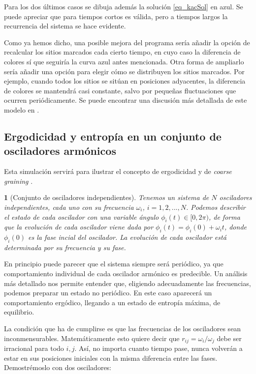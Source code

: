 \documentclass[11pt, a4paper]{article} %
\theoremstyle{named}
\newtheorem*{namedtheorem}{}
\begin{document}
Para los dos últimos casos se dibuja además la solución \eqref{eq_kacSol} en azul. Se puede apreciar que para tiempos cortos es válida, pero a tiempos largos la recurrencia del sistema se hace evidente.

Como ya hemos dicho, una posible mejora del programa sería añadir la opción de recalcular los sitios marcados cada cierto tiempo, en cuyo caso la diferencia de colores sí que seguiría la curva azul antes mencionada. Otra forma de ampliarlo sería añadir una opción para elegir cómo se distribuyen los sitios marcados. Por ejemplo, cuando todos los sitios se sitúan en posiciones adyacentes, la diferencia de colores se mantendrá casi constante, salvo por pequeñas fluctuaciones que ocurren periódicamente. Se puede encontrar una discusión más detallada de este modelo en \cite{haro}.

\subsection{Ergodicidad y entropía en un conjunto de osciladores armónicos}\label{sec:osciladores}

Esta simulación servirá para ilustrar el concepto de ergodicidad y de \textit{coarse graining}  \cite{groot}.

\begin{namedtheorem}[Conjunto de osciladores independientes]
Tenemos un sistema de $N$ osciladores independientes, cada uno con su frecuencia $\omega_i$, $i = 1,2,...,N$. Podemos describir el estado de cada oscilador con una variable ángulo $\phi_i (t) \in [0,2\pi)$, de forma que la evolución de cada oscilador viene dada por $\phi_i (t) = \phi_i (0) + \omega_i t$, donde $\phi_i(0)$ es la fase incial del oscilador. La evolución de cada oscilador está determinada por su frecuencia y su fase.
\end{namedtheorem}

En principio puede parecer que el sistema siempre será periódico, ya que comportamiento individual de cada oscilador armónico es predecible. Un análisis más detallado nos permite entender que, eligiendo adecuadamente las frecuencias, podemos preparar un estado no periódico. En este caso aparecerá un comportamiento ergódico, llegando a un estado de entropía máxima, de equilibrio.

La condición que ha de cumplirse es que las frecuencias de los osciladores sean inconmensurables. Matemáticamente esto quiere decir que $r_{ij}={\omega_i}/{\omega_j}$ debe ser irracional para todo $i, j$. Así, no importa cuanto tiempo pase, nunca volverán a estar en sus posiciones iniciales con la misma diferencia entre las fases. Demostrémoslo con dos osciladores:
\end{document}
